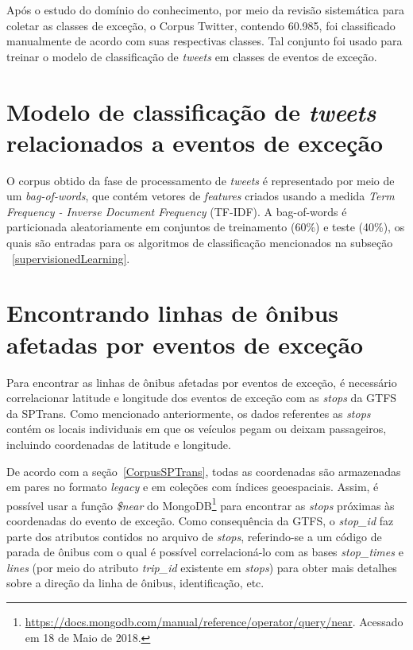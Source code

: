 \documentclass[
	12pt,				%
	oneside,			%
	a4paper,			%
	english,			%
	brazil				%
	]{abntex2ppgsi}
\begin{document}
Após o estudo do domínio do conhecimento, por meio da revisão sistemática para coletar as classes de exceção, o Corpus Twitter, contendo 60.985, foi classificado manualmente de acordo com suas respectivas classes. Tal conjunto foi usado para treinar o modelo de classificação de \textit{tweets} em classes de eventos de exceção. 

\section{Modelo de classificação de \textit{tweets} relacionados a eventos de exceção}
\label{model}

O corpus obtido da fase de processamento de \textit {tweets} é representado por meio de um \textit{bag-of-words}, que contém vetores de \textit{features} criados usando a medida \textit{Term Frequency - Inverse Document Frequency} (TF-IDF). A bag-of-words é particionada aleatoriamente em conjuntos de treinamento (60\%) e teste (40\%), os quais são entradas para os algoritmos de classificação mencionados na subseção ~\ref{supervisionedLearning}.

\section{Encontrando linhas de ônibus afetadas por eventos de exceção}

Para encontrar as linhas de ônibus afetadas por eventos de exceção, é necessário correlacionar latitude e longitude dos eventos de exceção com as \textit{stops} da GTFS da SPTrans. Como mencionado anteriormente, os dados referentes as \textit{stops} contém os locais individuais em que os veículos pegam ou deixam passageiros, incluindo coordenadas de latitude e longitude.

De acordo com a seção~\ref{CorpusSPTrans}, todas as coordenadas são armazenadas em pares no formato \textit{legacy} e em coleções com índices geoespaciais. Assim, é possível usar a função \textit{\$near} do MongoDB\footnote {\url{https://docs.mongodb.com/manual/reference/operator/query/near}. Acessado em 18 de Maio de 2018.} para encontrar as \textit{stops} próximas às coordenadas do evento de exceção. Como consequência da GTFS, o \textit{stop\_id} faz parte dos atributos contidos no arquivo de \textit{stops}, referindo-se a um código de parada de ônibus com o qual é possível correlacioná-lo com as bases \textit{stop\_times} e \textit{lines} (por meio do atributo \textit{trip\_id} existente em \textit{stops}) para obter mais detalhes sobre a direção da linha de ônibus, identificação, etc.
\end{document}
